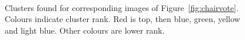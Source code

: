 \documentclass[11pt,a4paper]{kth-mag}
\begin{document}
\begin{figure}
  \centering
  \\
  \caption{Clusters found for corresponding images of
    Figure~\ref{fig:chairvote}. Colours indicate cluster rank. Red is top, then
    blue, green, yellow and light blue. Other colours are lower rank.}
  \label{fig:chaircluster}
\end{figure}
\end{document}
